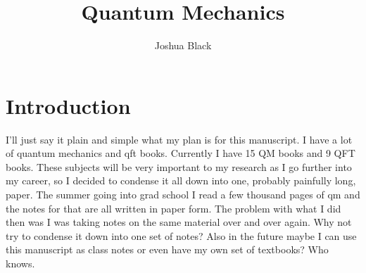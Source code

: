 \documentclass[preprint, review,12pt]{elsarticle}
\begin{document}
\begin{frontmatter}



\title{Quantum Mechanics}


\author{Joshua Black}



\end{frontmatter}



\section{Introduction}

I'll just say it plain and simple what my plan is for this manuscript. I have a lot of quantum mechanics and qft books. Currently I have 15 QM books and 9 QFT books. These subjects will be very important to my research as I go further into my career, so I decided to condense it all down into one, probably painfully long, paper. The summer going into grad school I read a few thousand pages of qm and the notes for that are all written in paper form. The problem with what I did then was I was taking notes on the same material over and over again. Why not try to condense it down into one set of notes? Also in the future maybe I can use this manuscript as class notes or even have my own set of textbooks? Who knows.
\end{document}
